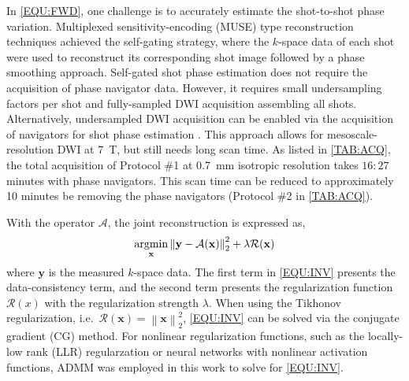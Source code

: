 \documentclass[journal,twoside,web]{ieeecolor}
\newcommand{\argmin}{\operatornamewithlimits{argmin}}
\newcommand{\norm}[1]{\left\lVert#1\right\rVert}
\begin{document}
	In \cref{EQU:FWD}, one challenge is
	to accurately estimate the shot-to-shot phase variation.
	Multiplexed sensitivity-encoding (MUSE) type reconstruction techniques
	\cite{liu_2004_diff_spiral,uecker_2009_nlinv_diff,chen_2013_muse,merrem_2019_nl_steam}
	achieved the self-gating strategy,
	where the $k$-space data of each shot were used to reconstruct
	its corresponding shot image followed by a phase smoothing approach.
	Self-gated shot phase estimation does not require
	the acquisition of phase navigator data.
	However, it requires small undersampling factors per shot and
	fully-sampled DWI acquisition assembling all shots.
	Alternatively, undersampled DWI acquisition can be enabled
	via the acquisition of navigators for shot phase estimation
	\cite{tan_2024_naviepi}.
	This approach allows for mesoscale-resolution DWI at \SI{7}{\tesla},
	but still needs long scan time.
	As listed in \cref{TAB:ACQ}, the total acquisition of
	Protocol \#1 at \SI{0.7}{mm} isotropic resolution
	takes $16:27$ minutes with phase navigators.
	This scan time can be reduced to approximately 10 minutes
	be removing the phase navigators (Protocol \#2 in \cref{TAB:ACQ}).

	With the operator $\mathcal{A}$, the joint reconstruction is expressed as,
	\begin{equation}
		\argmin_{\mathbf{x}} \norm{\mathbf{y} - \mathcal{A}(\mathbf{x})}_2^2 + \lambda \mathcal{R}(\mathbf{x})
		\label{EQU:INV}
	\end{equation}
	where $\mathbf{y}$ is the measured $k$-space data.
	The first term in \cref{EQU:INV} presents the data-consistency term, and
	the second term presents the regularization function $\mathcal{R}(x)$
	with the regularization strength $\lambda$.
	When using the Tikhonov regularization,
	i.e.~$\mathcal{R}(\mathbf{x}) = \norm{\mathbf{x}}_2^2$,
	\cref{EQU:INV} can be solved via the conjugate gradient (CG) method.
	For nonlinear regularization functions,
	such as the locally-low rank (LLR) regularzation \cite{tan_2024_naviepi} or
	neural networks with nonlinear activation functions,
	ADMM was employed in this work to solve for \cref{EQU:INV}.
\end{document}
